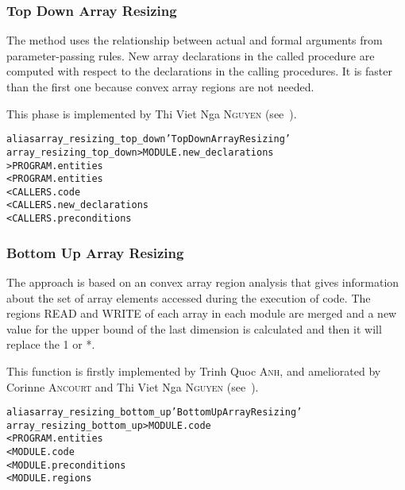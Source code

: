 \documentclass[a4paper]{report}
\newenvironment{PipsMake}{\begin{alltt}}{\end{alltt}}
\newenvironment{PipsPass}[1]{\label{pass:#1}}{}
\begin{document}
\subsubsection{Top Down Array Resizing}
\begin{PipsPass}{array_resizing_top_down}

The  method uses the relationship between actual and formal arguments from parameter-passing
rules. New array declarations in the called procedure are
computed with respect to the declarations in the calling procedures.
It is  faster than the first one because convex array regions are not needed.

This phase is implemented by Thi Viet Nga \textsc{Nguyen} (see~\cite{Ngu02}).
\end{PipsPass}

\begin{PipsMake}
alias array_resizing_top_down 'Top Down Array Resizing'
array_resizing_top_down         > MODULE.new_declarations
                                > PROGRAM.entities
        < PROGRAM.entities
        < CALLERS.code
        < CALLERS.new_declarations
        < CALLERS.preconditions
\end{PipsMake}

\subsubsection{Bottom Up Array Resizing}

\begin{PipsPass}{array_resizing_bottom_up}

The approach is based on an convex array region analysis that gives
  information about the set of array elements accessed during the
  execution of code. The regions READ and WRITE of each
array in each module are merged and a new value for the upper bound of the last
dimension is calculated and then it will replace the 1 or *.

This function is firstly implemented by Trinh Quoc \textsc{Anh}, and
ameliorated by Corinne \textsc{Ancourt} and Thi Viet Nga \textsc{Nguyen} (see~\cite{Ngu02}).
\end{PipsPass}

\begin{PipsMake}
alias array_resizing_bottom_up 'Bottom Up Array Resizing'
array_resizing_bottom_up         > MODULE.code
        < PROGRAM.entities
        < MODULE.code
        < MODULE.preconditions
        < MODULE.regions
\end{PipsMake}
\end{document}

